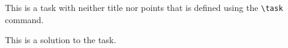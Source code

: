 \task

This is a task with neither title nor points that is defined using the \texttt{\textbackslash task} command.

\begin{solution}
    This is a solution to the task.
\end{solution}
